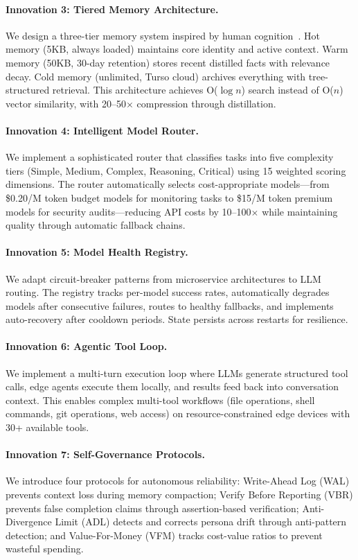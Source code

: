 \documentclass{article}
\begin{document}
\paragraph{Innovation 3: Tiered Memory Architecture.} We design a three-tier memory system inspired by human cognition~\cite{atkinson1971human}. Hot memory (5KB, always loaded) maintains core identity and active context. Warm memory (50KB, 30-day retention) stores recent distilled facts with relevance decay. Cold memory (unlimited, Turso cloud) archives everything with tree-structured retrieval. This architecture achieves O($\log n$) search instead of O($n$) vector similarity, with 20--50$\times$ compression through distillation.

\paragraph{Innovation 4: Intelligent Model Router.} We implement a sophisticated router that classifies tasks into five complexity tiers (Simple, Medium, Complex, Reasoning, Critical) using 15 weighted scoring dimensions. The router automatically selects cost-appropriate models—from \$0.20/M token budget models for monitoring tasks to \$15/M token premium models for security audits—reducing API costs by 10--100$\times$ while maintaining quality through automatic fallback chains.

\paragraph{Innovation 5: Model Health Registry.} We adapt circuit-breaker patterns from microservice architectures to LLM routing. The registry tracks per-model success rates, automatically degrades models after consecutive failures, routes to healthy fallbacks, and implements auto-recovery after cooldown periods. State persists across restarts for resilience.

\paragraph{Innovation 6: Agentic Tool Loop.} We implement a multi-turn execution loop where LLMs generate structured tool calls, edge agents execute them locally, and results feed back into conversation context. This enables complex multi-tool workflows (file operations, shell commands, git operations, web access) on resource-constrained edge devices with 30+ available tools.

\paragraph{Innovation 7: Self-Governance Protocols.} We introduce four protocols for autonomous reliability: Write-Ahead Log (WAL) prevents context loss during memory compaction; Verify Before Reporting (VBR) prevents false completion claims through assertion-based verification; Anti-Divergence Limit (ADL) detects and corrects persona drift through anti-pattern detection; and Value-For-Money (VFM) tracks cost-value ratios to prevent wasteful spending.
\end{document}
